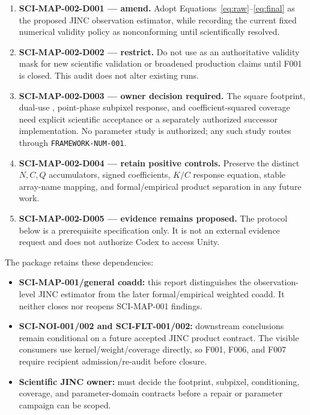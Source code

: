 \documentclass[10pt]{article}
\begin{document}
\begin{enumerate}[leftmargin=*]
  \item \textbf{SCI-MAP-002-D001 --- amend.}  Adopt
        Equations~\eqref{eq:raw}--\eqref{eq:final} as the proposed JINC
        observation estimator, while recording the current fixed numerical
        validity policy as nonconforming until scientifically resolved.
  \item \textbf{SCI-MAP-002-D002 --- restrict.}  Do not use
         as an authoritative validity mask for new
        scientific validation or broadened production claims until F001 is
        closed.  This audit does not alter existing runs.
  \item \textbf{SCI-MAP-002-D003 --- owner decision required.}  The square
        footprint, dual-use , point-phase subpixel response, and
        coefficient-squared coverage need explicit scientific acceptance or a
        separately authorized successor implementation.  No parameter study
        is authorized; any such study routes through \texttt{FRAMEWORK-NUM-001}.
  \item \textbf{SCI-MAP-002-D004 --- retain positive controls.}  Preserve the
        distinct $N,C,Q$ accumulators, signed coefficients, $K/C$ response
        equation, stable array-name mapping, and formal/empirical product
        separation in any future work.
  \item \textbf{SCI-MAP-002-D005 --- evidence remains proposed.}  The protocol
        below is a prerequisite specification only.  It is not an external
        evidence request and does not authorize Codex to access Unity.
\end{enumerate}

The package retains these dependencies:

\begin{itemize}[leftmargin=*]
  \item \textbf{SCI-MAP-001/general coadd:} this report distinguishes the
        observation-level JINC estimator from the later formal/empirical
        weighted coadd.  It neither closes nor reopens SCI-MAP-001 findings.
  \item \textbf{SCI-NOI-001/002 and SCI-FLT-001/002:} downstream conclusions
        remain conditional on a future accepted JINC product contract.  The
        visible consumers use kernel/weight/coverage directly, so F001, F006,
        and F007 require recipient admission/re-audit before closure.
  \item \textbf{Scientific JINC owner:} must decide the footprint, subpixel,
        conditioning, coverage, and parameter-domain contracts before a repair
        or parameter campaign can be scoped.
\end{itemize}
\end{document}
